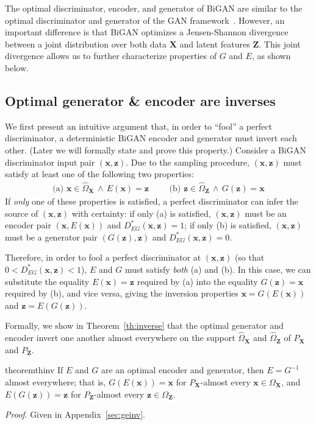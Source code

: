 \documentclass{article}
\newcommand{\proof}{\textit{Proof}.\xspace}
\renewcommand{\vec}[1]{\mathbf{#1}}
\newcommand{\x}{\vec{x}}
\newcommand{\X}{\vec{X}}
\newcommand{\OX}{\Omega_\X}
\newcommand{\hOX}{\hat{\Omega}_\X}
\newcommand{\z}{\vec{z}}
\newcommand{\Z}{\vec{Z}}
\newcommand{\OZ}{\Omega_\Z}
\newcommand{\hOZ}{\hat{\Omega}_\Z}
\begin{document}
The optimal discriminator, encoder, and generator of BiGAN are similar to the optimal discriminator and generator of the GAN framework~\citep{gan}.
However, an important difference is that BiGAN optimizes a Jensen-Shannon divergence between a joint distribution over both data $\X$ and latent features $\Z$.
This joint divergence allows us to further characterize properties of $G$ and $E$, as shown below.

\subsection{Optimal generator \& encoder are inverses}
We first present an intuitive argument that, in order to ``fool'' a perfect discriminator, a deterministic BiGAN encoder and generator must invert each other.
(Later we will formally state and prove this property.)
Consider a BiGAN discriminator input pair $(\x, \z)$.
Due to the sampling procedure, $(\x, \z)$ must satisfy at least one of the following two properties:
\begin{align*}
\text{(a) }
  \x \in \hOX
  \, \land \,
  E(\x) = \z
& & &
\text{(b) }
  \z \in \hOZ
  \, \land \,
  G(\z) = \x
\end{align*}
If \emph{only} one of these properties is satisfied, a perfect discriminator can infer the source of $(\x, \z)$ with certainty:
if only (a) is satisfied, $(\x, \z)$ must be an encoder pair $(\x, E(\x))$ and $D^*_{EG}(\x, \z) = 1$;
if only (b) is satisfied, $(\x, \z)$ must be a generator pair $(G(\z), \z)$ and $D^*_{EG}(\x, \z) = 0$.

Therefore, in order to fool a perfect discriminator at $(\x, \z)$ (so that $0 < D^*_{EG}(\x, \z) < 1$), $E$ and $G$ must satisfy \emph{both} (a) and (b).
In this case, we can substitute the equality $E(\x)=\z$ required by (a) into the equality $G(\z)=\x$ required by (b), and vice versa,
giving the inversion properties $\x = G(E(\x))$ and $\z = E(G(\z))$.

Formally, we show in Theorem~\ref{th:inverse} that the optimal generator and encoder invert one another almost everywhere on the support $\hOX$ and $\hOZ$ of $P_\X$ and $P_\Z$.
\begin{restatable}{theorem}{thinv}
  If $E$ and $G$ are an optimal encoder and generator, then $E = G^{-1}$ almost everywhere; that is,
  $G(E(\x))=\x$ for $P_\X$-almost every $\x \in \OX$, and
  $E(G(\z))=\z$ for $P_\Z$-almost every $\z \in \OZ$.
  \label{th:inverse}
\end{restatable}
\proof Given in Appendix~\ref{sec:geinv}.
\end{document}
